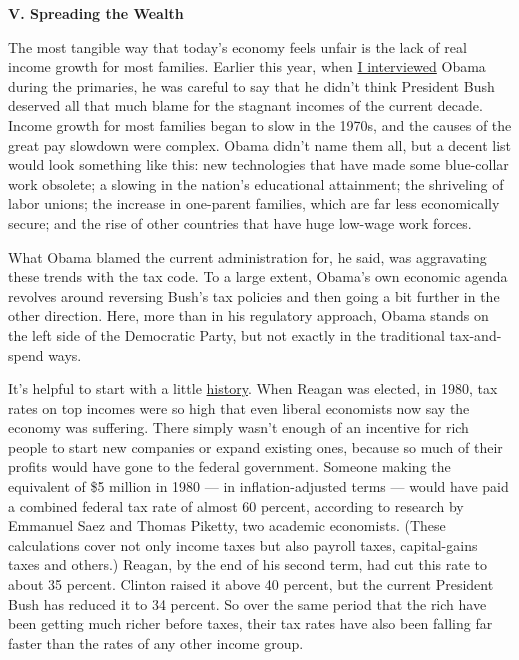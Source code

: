 \textbf{V. Spreading the Wealth}

The most tangible way that today's economy feels unfair is the lack of
real income growth for most families. Earlier this year, when
\href{http://www.nytimes3xbfgragh.onion/2008/02/02/us/politics/02obama.html?_r=1\&oref=slogin}{I
interviewed} Obama during the primaries, he was careful to say that he
didn't think President Bush deserved all that much blame for the
stagnant incomes of the current decade. Income growth for most families
began to slow in the 1970s, and the causes of the great pay slowdown
were complex. Obama didn't name them all, but a decent list would look
something like this: new technologies that have made some blue-collar
work obsolete; a slowing in the nation's educational attainment; the
shriveling of labor unions; the increase in one-parent families, which
are far less economically secure; and the rise of other countries that
have huge low-wage work forces.

What Obama blamed the current administration for, he said, was
aggravating these trends with the tax code. To a large extent, Obama's
own economic agenda revolves around reversing Bush's tax policies and
then going a bit further in the other direction. Here, more than in his
regulatory approach, Obama stands on the left side of the Democratic
Party, but not exactly in the traditional tax-and-spend ways.

It's helpful to start with a little
\href{http://elsa.berkeley.edu/~saez/piketty-saezJEP07taxprog.pdf}{history}.
When Reagan was elected, in 1980, tax rates on top incomes were so high
that even liberal economists now say the economy was suffering. There
simply wasn't enough of an incentive for rich people to start new
companies or expand existing ones, because so much of their profits
would have gone to the federal government. Someone making the equivalent
of \$5 million in 1980 --- in inflation-adjusted terms --- would have
paid a combined federal tax rate of almost 60 percent, according to
research by Emmanuel Saez and Thomas Piketty, two academic economists.
(These calculations cover not only income taxes but also payroll taxes,
capital-gains taxes and others.) Reagan, by the end of his second term,
had cut this rate to about 35 percent. Clinton raised it above 40
percent, but the current President Bush has reduced it to 34 percent. So
over the same period that the rich have been getting much richer before
taxes, their tax rates have also been falling far faster than the rates
of any other income group.


